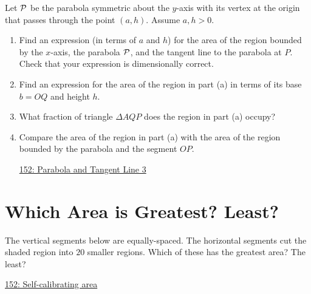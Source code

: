\documentclass{ximera}
\begin{document}
\begin{question} \label{Q88w4448ewe}
Let ${\cal P}$ be the parabola symmetric about the $y$-axis with its vertex at the origin that passes through the point $(a,h)$. Assume $a,h>0$.

\begin{enumerate}

\item Find an expression (in terms of $a$ and $h$) for the area of the region bounded by the $x$-axis, the parabola ${\cal P}$, and the tangent line to the parabola at $P$. Check that your expression is dimensionally correct.

\item Find an expression for the area of the region in part (a) in terms of its base $b=OQ$ and height $h$.

\item What fraction of triangle $\Delta AQP$ does the region in part (a) occupy?

\item Compare the area of the region in part (a) with the area of the region bounded by the parabola and the segment $OP$.

\begin{onlineOnly}
    \begin{center}
\end{center}
\end{onlineOnly}

\href{https://www.desmos.com/calculator/avl2r9dubt}{152: Parabola and Tangent Line 3}

\end{enumerate}
\end{question}


\section{Which Area is Greatest? Least?}

\begin{question} \label{QPlerredd}

The vertical segments below are equally-spaced. The horizontal segments cut the shaded region into $20$ smaller regions. Which of these has the greatest area? The least?

\begin{onlineOnly}
    \begin{center}
\end{center}
\end{onlineOnly}

\href{https://www.desmos.com/calculator/wsgteg55ta}{152: Self-calibrating area}
\end{question}
\end{document}
